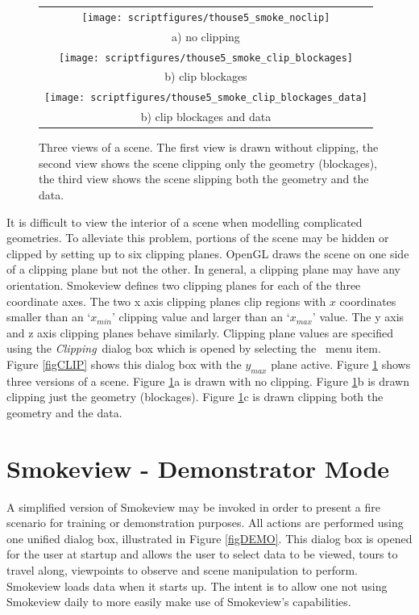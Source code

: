 \documentclass[11pt,twoside]{book}
\newcommand{\figoptions}{hbp}
\begin{document}
\begin{figure}[\figoptions]
\begin{center}
\begin{tabular}{c}
\texttt{[image: scriptfigures/thouse5\_smoke\_noclip]}\\
a) no clipping\\
\texttt{[image: scriptfigures/thouse5\_smoke\_clip\_blockages]}\\
b) clip blockages\\
\texttt{[image: scriptfigures/thouse5\_smoke\_clip\_blockages\_data]}\\
b) clip blockages and data\\
\end{tabular}
\end{center}
\caption[Clipping a scene.]{Three views of a
scene. The first view is drawn without clipping, the second
view shows the scene clipping only the geometry (blockages), the third view
shows the scene slipping both the geometry and the data.}
\label{figCLIPPED}
\end{figure}

It is difficult to view the interior of a scene when modelling
complicated geometries.  To alleviate this problem, portions of
the scene may be hidden or clipped by setting up to six clipping
planes. OpenGL draws the scene on one side of a clipping plane but
not the other. In general, a clipping plane may have any
orientation. Smokeview defines two clipping planes for each of the
three coordinate axes.   The two x axis clipping planes clip
regions with $x$ coordinates smaller than an `$x_{min}$' clipping
value and larger than an `$x_{max}$' value. The y axis and z axis
clipping planes behave similarly.  Clipping plane values are
specified using the {\em Clipping}\ dialog box which is opened by
selecting the \ menu item. Figure
\ref{figCLIP} shows this dialog box with the $y_{max}$ plane active.
Figure \ref{figCLIPPED} shows three versions of a scene.
Figure \ref{figCLIPPED}a is drawn with no clipping.
Figure \ref{figCLIPPED}b is drawn clipping just the geometry (blockages).
Figure \ref{figCLIPPED}c is drawn clipping both the geometry and the data.

\chapter{Smokeview - Demonstrator Mode}
A simplified version of Smokeview may be invoked in order to present a fire scenario for training or demonstration
purposes.  All actions are performed using one unified dialog box, illustrated in Figure \ref{figDEMO}.  This dialog box is opened for the user at startup and allows the user to select data to be viewed, tours to travel along, viewpoints to observe and scene manipulation to perform.  Smokeview loads data when it starts up.
The intent is to allow one not using Smokeview daily to more easily make use of Smokeview's capabilities.
\end{document}
